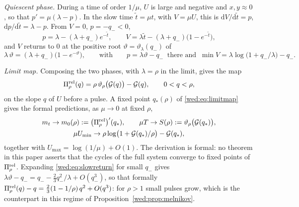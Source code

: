 \emph{Quiescent phase.} During a time of order $1/\mu$, $U$ is large and negative and $x,y\approx0$, so that $p'=\mu(\lambda-p)$. In the slow time $\tilde t=\mu t$, with $V=\mu U$, this is $\mathrm dV/\mathrm d\tilde t=p$, $\mathrm dp/\mathrm d\tilde t=\lambda-p$. From $V=0$, $p=-q_-<0$,
\[
p=\lambda-(\lambda+q_-)e^{-\tilde t},\qquad V=\lambda\tilde t-(\lambda+q_-)\bigl(1-e^{-\tilde t}\bigr),
\]
and $V$ returns to $0$ at the positive root $\vartheta=\vartheta_\lambda(q_-)$ of
\begin{equation}\label{wed:eq:slowreturn}
\lambda\,\vartheta=(\lambda+q_-)\bigl(1-e^{-\vartheta}\bigr),
\qquad\text{with}\qquad p=\lambda\vartheta-q_-\ \text{ there and }\ \min V=\lambda\log\bigl(1+q_-/\lambda\bigr)-q_- .
\end{equation}

\emph{Limit map.} Composing the two phases, with $\lambda=\rho$ in the limit, gives the map
\begin{equation}\label{wed:eq:limitmap}
\Pi^{\rm rel}_\rho(q)=\rho\,\vartheta_\rho\bigl(\mathcal G(q)\bigr)-\mathcal G(q),\qquad 0<q<\rho,
\end{equation}
on the slope $q$ of $U$ before a pulse. A fixed point $q_*(\rho)$ of \eqref{wed:eq:limitmap} gives the formal predictions, as $\mu\to0$ at fixed $\rho$,
\begin{equation}\label{wed:eq:relaxpredictions}
\begin{gathered}
m_t\to m_0(\rho):=\bigl(\Pi^{\rm rel}_\rho\bigr)'(q_*),\qquad
\mu T\to S(\rho):=\vartheta_\rho\bigl(\mathcal G(q_*)\bigr),\\
\mu U_{\min}\to\rho\log\bigl(1+\mathcal G(q_*)/\rho\bigr)-\mathcal G(q_*),
\end{gathered}
\end{equation}
together with $U_{\max}=\log(1/\mu)+O(1)$. The derivation is formal: no theorem in this paper asserts that the cycles of the full system converge to fixed points of $\Pi^{\rm rel}_\rho$. Expanding \eqref{wed:eq:slowreturn} for small $q_-$ gives $\lambda\vartheta-q_-=q_--\tfrac23q_-^2/\lambda+O(q_-^3)$, so that formally $\Pi^{\rm rel}_\rho(q)-q=\tfrac23(1-1/\rho)\,q^2+O(q^3)$: for $\rho>1$ small pulses grow, which is the counterpart in this regime of Proposition~\ref{wed:prop:melnikov}.

